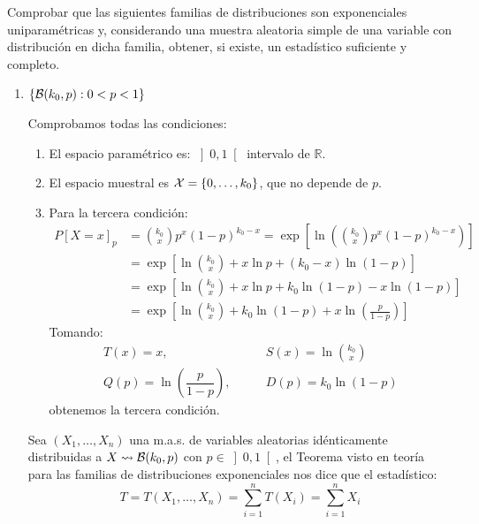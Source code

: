 \begin{ejercicio}\label{ej:2.3.7}
    Comprobar que las siguientes familias de distribuciones son exponenciales uniparamétricas y, considerando una muestra aleatoria simple de una variable con distribución en dicha familia, obtener, si existe, un estadístico suficiente y completo.
    \begin{enumerate}[label=\alph*)]
        \item $\{\mathcal{B}(k_0,p) : 0<p<1\}$

            Comprobamos todas las condiciones:
            \begin{enumerate}[label=\arabic*.]
                \item El espacio paramétrico es: $\left]0,1\right[$ intervalo de $\mathbb{R}$.
                \item El espacio muestral es $\mathcal{X} = \{0,\ldots,k_0\}$, que no depende de $p$.
                \item Para la tercera condición:
                    \begin{align*}
                        P[X=x]_p &= \binom{k_0}{x} p^{x}{(1-p)}^{k_0-x} = \exp\left[\ln\left(\binom{k_0}{x}p^{x}{(1-p)}^{k_0-x} \right)\right]\\
                               &= \exp\left[\ln\binom{k_0}{x} + x\ln p + (k_0-x)\ln(1-p)\right] \\
                               &= \exp\left[\ln\binom{k_0}{x} + x\ln p + k_0 \ln (1-p) - x\ln(1-p)\right] \\
                               &= \exp\left[\ln\binom{k_0}{x} + k_0 \ln (1-p) + x\ln\left(\frac{p}{1-p}\right)\right] 
                    \end{align*}
                    Tomando:
                    \begin{align*}
                        T(x) = x, &\qquad S(x) = \ln\binom{k_0}{x} \\
                        Q(p) = \ln\left(\dfrac{p}{1-p}\right), &\qquad D(p) = k_0\ln(1-p)
                    \end{align*}
                    obtenemos la tercera condición. 
            \end{enumerate}
            Sea $(X_1, \ldots, X_n)$ una m.a.s. de variables aleatorias idénticamente distribuidas a $X\rightsquigarrow \mathcal{B}(k_0,p)$ con $p\in \left]0,1\right[$, el Teorema visto en teoría para las familias de distribuciones exponenciales nos dice que el estadístico:
            \begin{equation*}
                T = T(X_1, \ldots, X_n) = \sum_{i=1}^{n}T(X_i) = \sum_{i=1}^{n}X_i

\end{equation*}
\end{enumerate}
\end{ejercicio}
